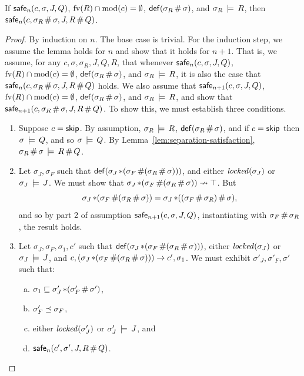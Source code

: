 \documentclass[11pt]{article}
\begin{document}
\begin{lemma}
	\label{lem:weak-interleaving-safe}
	If $\mathsf{safe}_{n}(c,\sigma,J,Q)$, $\mathrm{fv}(R) \cap \mathrm{mod}(c) = \operatorname{\emptyset}$, $\mathsf{def}(\sigma_R \operatorname{\#} \sigma)$, and $\sigma_R \,\models\, R$, then $\mathsf{safe}_{n}(c, \sigma_R \operatorname{\#} \sigma,J,R \operatorname{\#} Q)$. 
\end{lemma}

\begin{proof}
	By induction on $n$. The base case is trivial. For the induction step, we assume the lemma holds for $n$ and show that it holds for $n+1$. That is, we assume, for any $c,\sigma,\sigma_R,J,Q,R$, that whenever $\mathsf{safe}_{n}(c,\sigma,J,Q)$, $\mathrm{fv}(R) \cap \mathrm{mod}(c) = \operatorname{\emptyset}$, $\mathsf{def}(\sigma_R \operatorname{\#} \sigma)$, and $\sigma_R \,\models\, R$, it is also the case that $\mathsf{safe}_{n}(c,\sigma_R \operatorname{\#} \sigma,J,R \operatorname{\#} Q)$ holds. We also assume that $\mathsf{safe}_{n+1}(c,\sigma,J,Q)$, $\mathrm{fv}(R) \cap \mathrm{mod}(c) = \operatorname{\emptyset}$, $\mathsf{def}(\sigma_R \operatorname{\#} \sigma)$, and $\sigma_R \,\models\, R$, and show that \\ 
	$\mathsf{safe}_{n+1}(c,\sigma_R \operatorname{\#} \sigma,J,R \operatorname{\#} Q)$. To show this, we must establish three conditions. 

	\begin{enumerate}
		\item Suppose $c = \operatorname{\mathsf{skip}}$. By assumption, $\sigma_R \,\models\, R$, $\mathsf{def}(\sigma_R \operatorname{\#} \sigma)$, and if $c = \operatorname{\mathsf{skip}}$ then $\sigma \,\models\, Q$, and so $\sigma \,\models\, Q$. By Lemma~\ref{lem:separation-satisfaction}, $\sigma_R \operatorname{\#} \sigma \,\models\, R \operatorname{\#} Q$. 

		\item Let $\sigma_J,\sigma_F$ such that $\mathsf{def}(\sigma_J \operatorname{\ast} (\sigma_F \operatorname{\#} (\sigma_R \operatorname{\#} \sigma)))$, and either $\mathit{locked}(\sigma_J)$ or $\sigma_J \,\models\, J$. We must show that $\sigma_J \operatorname{\ast} (\sigma_F \operatorname{\#} (\sigma_R \operatorname{\#} \sigma)) \nrightarrow \top$. But \[ \sigma_J \operatorname{\ast} (\sigma_F \operatorname{\#} (\sigma_R \operatorname{\#} \sigma)) = \sigma_J \operatorname{\ast} ((\sigma_F \operatorname{\#} \sigma_R) \operatorname{\#} \sigma),\] and so by part 2 of assumption $\mathsf{safe}_{n+1}(c,\sigma,J,Q)$, instantiating with $\sigma_F \operatorname{\#} \sigma_R$, the result holds. 

		\item Let $\sigma_J,\sigma_F,\sigma_1,c'$ such that $\mathsf{def}(\sigma_J \operatorname{\ast} (\sigma_F \operatorname{\#} (\sigma_R \operatorname{\#} \sigma)))$, either $\mathit{locked}(\sigma_J)$ or $\sigma_J \,\models\, J$, and $c,(\sigma_J \operatorname{\ast} (\sigma_F \operatorname{\#} (\sigma_R \operatorname{\#} \sigma))) \rightarrow c',\sigma_1$. We must exhibit $\sigma'_J,\sigma'_F,\sigma'$ such that: \begin{enumerate}[(a)]
			\item $\sigma_1 \sqsubseteq \sigma'_J \operatorname{\ast} (\sigma'_F \operatorname{\#} \sigma')$,
			\item $\sigma'_F \preceq \sigma_F$, 
			\item either $\mathit{locked}(\sigma'_J)$ or $\sigma'_J \,\models\, J$, and
			\item $\mathsf{safe}_{n}(c',\sigma',J,R \operatorname{\#} Q)$. 
		\end{enumerate}


\end{enumerate}
\end{proof}
\end{document}
